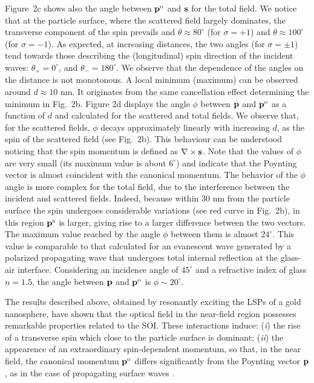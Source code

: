 \documentclass[journal=apchd5,manuscript=article]{achemso}
\begin{document}
Figure~2c shows also the angle between ${\bf p}^{\rm o}$ and ${\bf s}$ for the total field. We notice that at the particle surface, where the scattered field largely dominates, the transverse component of the spin prevails and $\theta \approx 80^{\circ}$ (for $\sigma=+1$) and $\theta \approx 100^{\circ}$ (for $\sigma= - 1$). As expected, at increasing distances, the two angles (for $\sigma= \pm 1$) tend towards those describing the (longitudinal) spin direction of the incident waves:  $\theta_+ = 0^{\circ}$, and $\theta_- = 180^{\circ}$. We observe that the dependence of the angles on the distance is not monotonous. A local minimum (maximum) can be observed around $d \approx 10$ nm. It originates from the same cancellation effect determining the minimum in Fig.~2b.
Figure 2d displays the angle $\phi$ between $\bf p$ and ${\bf p}^{\rm o}$ as a function of $d$ and calculated for the scattered and total fields. 
We observe that, for the scattered fields, $\phi$ decays approximately linearly with increasing $d$, as the spin of the scattered field (see Fig.~2b). This behaviour can be understood noticing that the spin momentum is defined as ${\bf \nabla \times s}$.
Note that the values of $\phi$  are very small (its maximum value is about $6^{\circ}$) and indicate that the Poynting vector is almost coincident with the canonical momentum. The behavior of the $\phi$ angle is more complex for the total field, due to the interference between the incident and scattered fields. Indeed, because within $30$ nm from the particle surface the spin undergoes considerable variations (see red curve in Fig.~2b), in this region ${\bf p}^{\rm s}$ is larger, giving rise to a larger difference between the two vectors. The maximum value reached by the angle $\phi$ between them is almost $24^{\circ}$. This value is comparable to that calculated for an evanescent wave generated by a polarized propagating wave that undergoes total internal reflection at the glass-air interface. Considering an incidence angle of $45^{\circ}$ and a refractive index of glass $n=1.5$, the angle between $\bf p$ and ${\bf p}^{\rm o}$ is $\phi \sim 20^{\circ}$. 

The results described above, obtained by resonantly exciting the LSPs of a gold nanosphere, have shown that the optical field in the near-field region possesses remarkable properties related to the SOI. 
These interactions induce: (\textit{i}) the rise of a transverse spin which close to the particle surface is dominant; (\textit{ii}) the appearence of an extraordinary spin-dependent momentum, so that, in the near field, the canonical momentum  ${\bf p}^{\rm o}$ differs significantly from the Poynting vector $\bf p$, as in the case of propagating surface waves \cite{bliokh2015,Bliokh2014}. 
\end{document}
